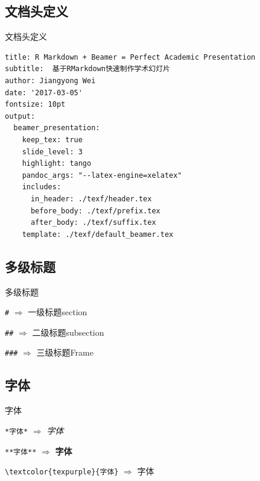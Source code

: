 \documentclass[10pt,ignorenonframetext,aspectratio=169,t,]{beamer} %
\begin{document}
\subsection{文档头定义}

\begin{frame}[fragile]{文档头定义}

\begin{verbatim}
title: R Markdown + Beamer = Perfect Academic Presentation
subtitle:  基于RMarkdown快速制作学术幻灯片
author: Jiangyong Wei
date: '2017-03-05'
fontsize: 10pt
output: 
  beamer_presentation:
    keep_tex: true
    slide_level: 3
    highlight: tango
    pandoc_args: "--latex-engine=xelatex"
    includes:
      in_header: ./texf/header.tex
      before_body: ./texf/prefix.tex
      after_body: ./texf/suffix.tex
    template: ./texf/default_beamer.tex
\end{verbatim}

\end{frame}

\subsection{多级标题}

\begin{frame}[fragile]{多级标题}

\texttt{\#} \(\Rightarrow\) 一级标题section

\vspace{12pt}

\texttt{\#\#} \(\Rightarrow\) 二级标题subsection

\vspace{12pt}

\texttt{\#\#\#} \(\Rightarrow\) 三级标题Frame

\end{frame}

\subsection{字体}

\begin{frame}[fragile]{字体}

\texttt{*字体*} \(\Rightarrow\) \emph{字体}

\vspace{12pt}

\texttt{**字体**} \(\Rightarrow\) \textbf{字体}

\vspace{12pt}

\texttt{\textbackslash{}textcolor\{texpurple\}\{字体\}} \(\Rightarrow\)
\textcolor{texpurple}{字体}

\end{frame}
\end{document}
